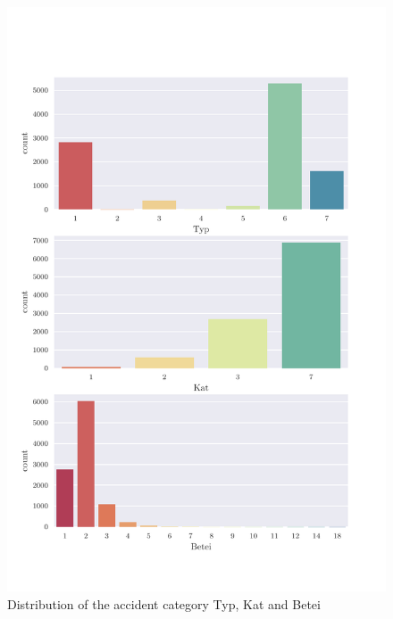 \documentclass[a4paper,headsepline,footsepline,fontsize=11pt,BCOR=12mm,DIV=12]{report}
\begin{document}
\begin{appendices}
\begin{figure}[h]
	\centering
	\includegraphics[scale=0.7]{../CorrAnalysis/data/BAYSIS/01_dataset/plots/baysis_dataset_count_multiple01}
	\caption{Distribution of the accident category Typ, Kat and Betei}
	\label{img:appendix_baysis_dataset_01}
\end{figure}


\end{appendices}
\end{document}
